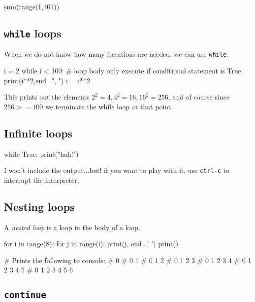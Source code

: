 \documentclass[12pt]{article} \newif\ifsolution\solutiontrue %
\begin{document}
\begin{python}
sum(range(1,101))
\end{python}

\subsection{\texorpdfstring{\texttt{while}
loops}{while loops}}\label{while-loops}

When we do not know how many iterations are needed, we can use
\texttt{while}.

\begin{python}
i = 2
while i < 100:     # loop body only execute if conditional statement is True
    print(i**2,end=", ")
    i = i**2
\end{python}

This prints out the elements $2^2 = 4, 4^2 = 16, 16^2 = 256$, and of course since $256 >= 100$ we terminate the while loop at that point.

\subsection{Infinite loops}\label{infinite-loops}

\begin{python}
while True:
    print("hah!")
\end{python}

I won't include the output...but! if you want to play with it, use \texttt{ctrl-c} to interrupt the interpreter.

\subsection{Nesting loops}\label{nesting-loops}

A \emph{nested loop} is a loop in the body of a loop.

\begin{python}
for i in range(8):
    for j in range(i):
        print(j, end=' ')
    print()

# Prints the following to console:
# 0
# 0 1 
# 0 1 2 
# 0 1 2 3 
# 0 1 2 3 4 
# 0 1 2 3 4 5 
# 0 1 2 3 4 5 6    
\end{python}

\subsection{\texorpdfstring{\texttt{continue}}{continue}}\label{continue}
\end{document}
